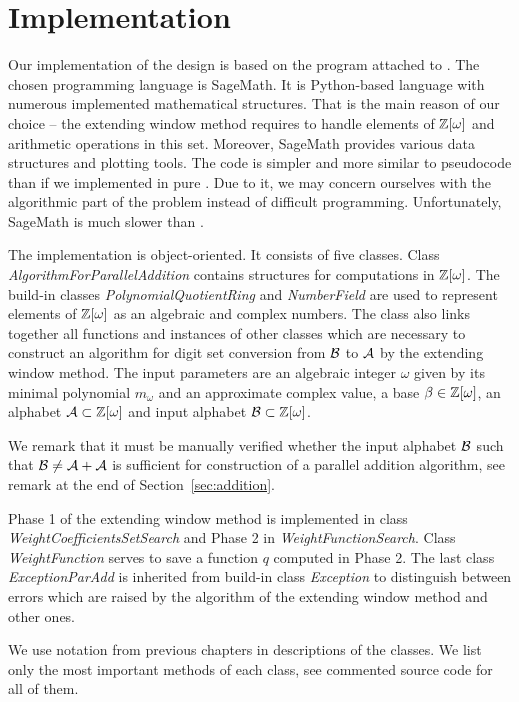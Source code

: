 \section{Implementation}
\label{sec:implementation}
Our implementation of the design is based on the program attached to \cite{vu}. The chosen programming language is SageMath. It is Python-based language with numerous implemented mathematical structures. That is the main reason of our choice -- the extending window method requires to handle elements of $\mathbb{Z}[\omega]$ and arithmetic operations in this set. Moreover, SageMath provides various data structures and plotting tools.  The code is simpler and more similar to pseudocode than if we implemented in pure \Cpp. Due to it, we may concern ourselves with the algorithmic part of the problem instead of difficult programming. Unfortunately, SageMath is much slower than \Cpp.


The implementation is object-oriented. It consists of five classes. Class \emph{AlgorithmForParallelAddition} contains structures for computations in $\mathbb{Z}[\omega]$. The build-in classes \emph{PolynomialQuotientRing} and \emph{NumberField} are used to represent elements of $\mathbb{Z}[\omega]$ as an algebraic and complex numbers. The class also links together all functions and instances of other classes which are necessary to construct an algorithm for digit set conversion from $\mathcal{B}$ to $\mathcal{A}$ by the extending window method. The input parameters are an algebraic integer $\omega$ given by its minimal polynomial $m_\omega$ and an approximate complex value, a base $\beta\in\mathbb{Z}[\omega]$, an alphabet $\mathcal{A}\subset\mathbb{Z}[\omega]$ and input alphabet $\mathcal{B}\subset\mathbb{Z}[\omega]$. 

We remark that it must be manually verified whether the input alphabet $\mathcal{B}$ such that $\mathcal{B}\neq\mathcal{A}+\mathcal{A}$ is sufficient for construction of a parallel addition algorithm, see remark at the end of Section~\ref{sec:addition}.

Phase 1 of the extending window method is implemented in class \emph{WeightCoefficientsSetSearch} and Phase 2 in \emph{WeightFunctionSearch}. Class \emph{WeightFunction} serves to save a function $q$ computed in Phase 2. The last class \emph{ExceptionParAdd} is inherited from build-in class \emph{Exception} to distinguish between errors which are raised by the algorithm  of the extending window method and other ones.

We use notation from previous chapters in descriptions of the classes. We list only the most important methods of each class, see commented source code for all of them.  

